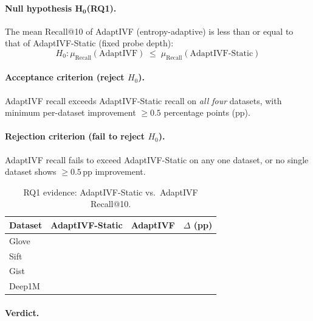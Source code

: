 \paragraph{Null hypothesis $\boldsymbol{H_0}$(RQ1).}
The mean Recall@10 of AdaptIVF (entropy-adaptive) is less than or equal to
that of AdaptIVF-Static (fixed probe depth):
\[
  H_0: \mu_{\text{Recall}}(\text{AdaptIVF}) \;\leq\; \mu_{\text{Recall}}(\text{AdaptIVF-Static})
\]

\paragraph{Acceptance criterion (reject $H_0$).}
AdaptIVF recall exceeds AdaptIVF-Static recall on \emph{all four} datasets,
with minimum per-dataset improvement $\geq 0.5$ percentage points (pp).

\paragraph{Rejection criterion (fail to reject $H_0$).}
AdaptIVF recall fails to exceed AdaptIVF-Static on any one dataset, or no
single dataset shows $\geq 0.5$\,pp improvement.

\begin{table}[h]
\centering
\caption{RQ1 evidence: AdaptIVF-Static vs.\ AdaptIVF Recall@10.}
\label{tab:appendix:rq1}
\begin{tabular}{lccc}
\toprule
Dataset & AdaptIVF-Static & AdaptIVF & $\Delta$ (pp) \\
\midrule
Glove  & \placeholder{\_\_\_} & \placeholder{\_\_\_} & \placeholder{\_\_\_} \\
Sift   & \placeholder{\_\_\_} & \placeholder{\_\_\_} & \placeholder{\_\_\_} \\
Gist   & \placeholder{\_\_\_} & \placeholder{\_\_\_} & \placeholder{\_\_\_} \\
Deep1M & \placeholder{\_\_\_} & \placeholder{\_\_\_} & \placeholder{\_\_\_} \\
\bottomrule
\end{tabular}
\end{table}

\paragraph{Verdict.}

